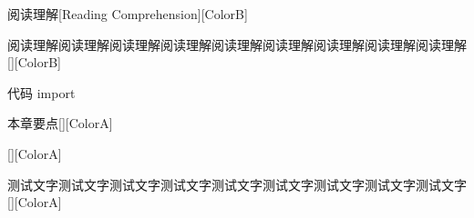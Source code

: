 \documentclass[color=blue]{textbook-cn}%
\newlength{\la}\newlength{\lb}\newlength{\lc}\newlength{\ld}
\begin{document}
\begin{Project}


\begin{Paracol}
\RelaInfo{\zhlipsum[3]}
\switchcolumn
\RelaInfo{\bfseries\lipsum[3][1-3]}

\end{Paracol}



\begin{box8}{阅读理解}[Reading Comprehension][ColorB]
\lipsum
\end{box8}


\begin{box8}{阅读理解阅读理解阅读理解阅读理解阅读理解阅读理解阅读理解阅读理解阅读理解}[][ColorB]
	\lipsum
\end{box8}




\begin{Vocabulary}
	\lipsum[2]
	\lipsum[2]
\end{Vocabulary}




\begin{PythonBox}{代码}
import
\end{PythonBox}



\begin{box0}[left=0mm]{本章要点}[][ColorA]
\lipsum[3]
\end{box0}

\begin{box0}[left=0mm]{ }[][ColorA]
	\lipsum[3]
\end{box0}

\begin{box0}[left=0mm]{测试文字测试文字测试文字测试文字测试文字测试文字测试文字测试文字测试文字}[][ColorA]
	\lipsum[3]
\end{box0}



\begin{Exercise}
\lipsum[2]
\end{Exercise}


\Example{\lipsum[2]}



\begin{Proof}
	\lipsum[2]
\end{Proof}





\makeatother

\end{Project}
\end{document}

